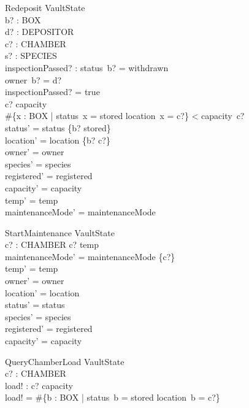 \documentclass{article}
\begin{document}
\begin{schema}{Redeposit}
\Delta VaultState\\
b? : BOX\\
d? : DEPOSITOR\\
c? : CHAMBER\\
s? : SPECIES\\
inspectionPassed? : \bool
\where
status~b? = withdrawn\\
owner~b? = d?\\
inspectionPassed? = true\\
c? \in \dom capacity\\
\#\{x : BOX | status~x = stored \land location~x = c?\} < capacity~c?\\
status' = status \oplus \{b? \mapsto stored\}\\
location' = location \cup \{b? \mapsto c?\}\\
owner' = owner\\
species' = species\\
registered' = registered\\
capacity' = capacity\\
temp' = temp\\
maintenanceMode' = maintenanceMode
\end{schema}

\begin{schema}{StartMaintenance}
\Delta VaultState\\
c? : CHAMBER
\where
c? \in \dom temp\\
maintenanceMode' = maintenanceMode \cup \{c?\}\\
temp' = temp\\
owner' = owner\\
location' = location\\
status' = status\\
species' = species\\
registered' = registered\\
capacity' = capacity
\end{schema}

\begin{schema}{QueryChamberLoad}
\Xi VaultState\\
c? : CHAMBER\\
load! : \nat
\where
c? \in \dom capacity\\
load! = \#\{b : BOX | status~b = stored \land location~b = c?\}
\end{schema}
\end{document}
